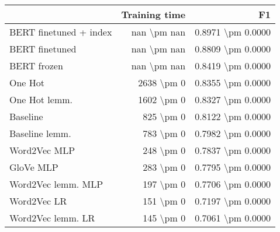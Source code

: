\begin{tabular}{lrr}
\toprule
{} & Training time &                 F1 \\
\midrule
BERT finetuned + index &   nan \textbackslash pm nan &  0.8971 \textbackslash pm 0.0000 \\
BERT finetuned         &   nan \textbackslash pm nan &  0.8809 \textbackslash pm 0.0000 \\
BERT frozen            &   nan \textbackslash pm nan &  0.8419 \textbackslash pm 0.0000 \\
One Hot                &    2638 \textbackslash pm 0 &  0.8355 \textbackslash pm 0.0000 \\
One Hot lemm.          &    1602 \textbackslash pm 0 &  0.8327 \textbackslash pm 0.0000 \\
Baseline               &     825 \textbackslash pm 0 &  0.8122 \textbackslash pm 0.0000 \\
Baseline lemm.         &     783 \textbackslash pm 0 &  0.7982 \textbackslash pm 0.0000 \\
Word2Vec MLP           &     248 \textbackslash pm 0 &  0.7837 \textbackslash pm 0.0000 \\
GloVe MLP              &     283 \textbackslash pm 0 &  0.7795 \textbackslash pm 0.0000 \\
Word2Vec lemm. MLP     &     197 \textbackslash pm 0 &  0.7706 \textbackslash pm 0.0000 \\
Word2Vec LR            &     151 \textbackslash pm 0 &  0.7197 \textbackslash pm 0.0000 \\
Word2Vec lemm. LR      &     145 \textbackslash pm 0 &  0.7061 \textbackslash pm 0.0000 \\
\bottomrule
\end{tabular}
